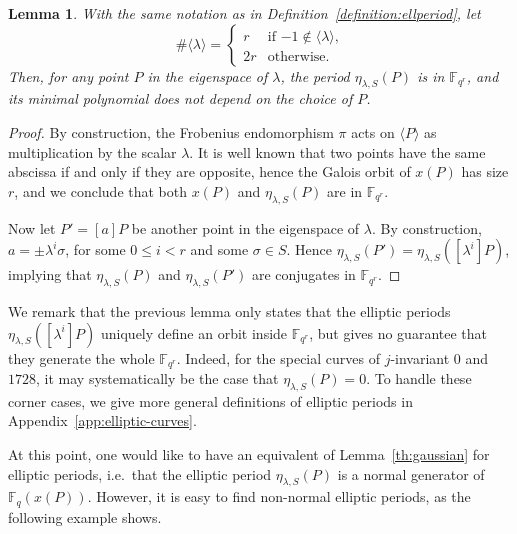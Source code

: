 \documentclass[12pt]{article}
\theoremstyle{plain}
\newtheorem{lemma}[theorem]{Lemma}
\theoremstyle{definition}
\def\F{\ensuremath{\mathbb{F}}}
\begin{document}
\begin{lemma}
  \label{lemma:ellperiods-order}
  With the same notation as in Definition~\ref{definition:ellperiod},
  let
  \begin{equation*}
    \#\langle\lambda\rangle =
    \begin{cases}
      r & \text{if $-1\notin\langle\lambda\rangle$,}\\
      2r & \text{otherwise.}
    \end{cases}
  \end{equation*}
  Then, for any point $P$ in the eigenspace of $\lambda$, the period
  $\eta_{\lambda,S}(P)$ is in $\F_{q^r}$, and its minimal polynomial
  does not depend on the choice of $P$.
\end{lemma}
\begin{proof}
  By construction, the Frobenius endomorphism $\pi$ acts on
  $\langle P\rangle$ as multiplication by the scalar $\lambda$. It is
  well known that two points have the same abscissa if and only if
  they are opposite, hence the Galois orbit of $x(P)$ has size $r$,
  and we conclude that both $x(P)$ and $\eta_{\lambda,S}(P)$ are in
  $\F_{q^r}$.

  Now let $P'=[a]P$ be another point in the eigenspace of
  $\lambda$. By construction, $a=\pm \lambda^i\sigma$, for some
  $0\le i<r$ and some $\sigma\in S$. Hence
  $\eta_{\lambda,S}(P')=\eta_{\lambda,S}([\lambda^i]P)$, implying that
  $\eta_{\lambda,S}(P)$ and $\eta_{\lambda,S}(P')$ are conjugates in
  $\F_{q^r}$.
\end{proof}

We remark that the previous lemma only states that the elliptic
periods $\eta_{\lambda,S}([\lambda^i]P)$ uniquely define an orbit
inside $\F_{q^r}$, but gives no guarantee that they generate the whole
$\F_{q^r}$. Indeed, for the special curves of $j$-invariant $0$ and
$1728$, it may systematically be the case that
$\eta_{\lambda,S}(P)=0$.
To handle these corner cases, we give more general definitions of elliptic
periods in Appendix~\ref{app:elliptic-curves}.

At this point, one would like to have an equivalent of
Lemma~\ref{th:gaussian} for elliptic periods, i.e.\ that the elliptic
period $\eta_{\lambda,S}(P)$ is a normal generator of $\F_q(x(P))$.
However, it is easy to find non-normal elliptic periods, as the
following example shows.
\end{document}
